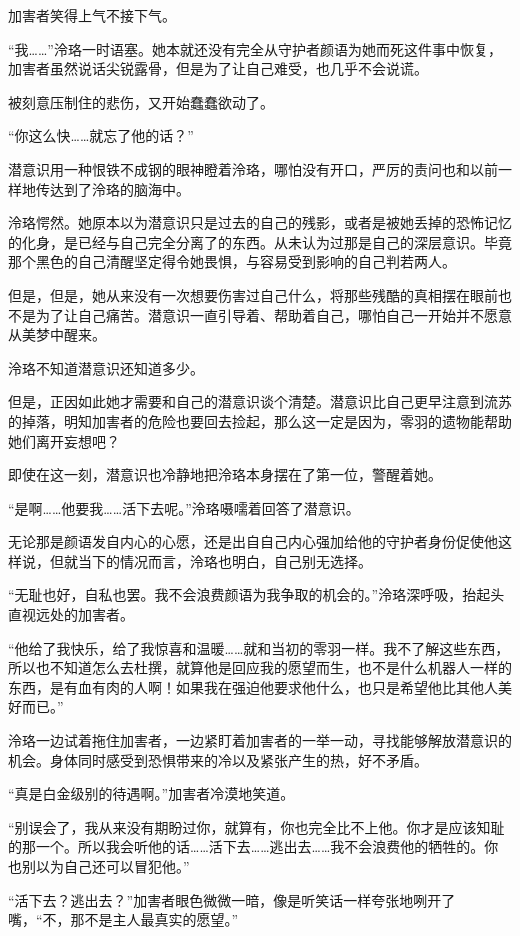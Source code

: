 \documentclass[UTF8, scheme = chinese, openany]{ctexbook}
\begin{document}
加害者笑得上气不接下气。

“我……”泠珞一时语塞。她本就还没有完全从守护者颜语为她而死这件事中恢复，加害者虽然说话尖锐露骨，但是为了让自己难受，也几乎不会说谎。

被刻意压制住的悲伤，又开始蠢蠢欲动了。

“你这么快……就忘了他的话？”

潜意识用一种恨铁不成钢的眼神瞪着泠珞，哪怕没有开口，严厉的责问也和以前一样地传达到了泠珞的脑海中。

泠珞愕然。她原本以为潜意识只是过去的自己的残影，或者是被她丢掉的恐怖记忆的化身，是已经与自己完全分离了的东西。从未认为过那是自己的深层意识。毕竟那个黑色的自己清醒坚定得令她畏惧，与容易受到影响的自己判若两人。

但是，但是，她从来没有一次想要伤害过自己什么，将那些残酷的真相摆在眼前也不是为了让自己痛苦。潜意识一直引导着、帮助着自己，哪怕自己一开始并不愿意从美梦中醒来。

泠珞不知道潜意识还知道多少。

但是，正因如此她才需要和自己的潜意识谈个清楚。潜意识比自己更早注意到流苏的掉落，明知加害者的危险也要回去捡起，那么这一定是因为，零羽的遗物能帮助她们离开妄想吧？

即使在这一刻，潜意识也冷静地把泠珞本身摆在了第一位，警醒着她。

“是啊……他要我……活下去呢。”泠珞嗫嚅着回答了潜意识。

无论那是颜语发自内心的心愿，还是出自自己内心强加给他的守护者身份促使他这样说，但就当下的情况而言，泠珞也明白，自己别无选择。

“无耻也好，自私也罢。我不会浪费颜语为我争取的机会的。”泠珞深呼吸，抬起头直视远处的加害者。

“他给了我快乐，给了我惊喜和温暖……就和当初的零羽一样。我不了解这些东西，所以也不知道怎么去杜撰，就算他是回应我的愿望而生，也不是什么机器人一样的东西，是有血有肉的人啊！如果我在强迫他要求他什么，也只是希望他比其他人美好而已。”

泠珞一边试着拖住加害者，一边紧盯着加害者的一举一动，寻找能够解放潜意识的机会。身体同时感受到恐惧带来的冷以及紧张产生的热，好不矛盾。

“真是白金级别的待遇啊。”加害者冷漠地笑道。

“别误会了，我从来没有期盼过你，就算有，你也完全比不上他。你才是应该知耻的那一个。所以我会听他的话……活下去……逃出去……我不会浪费他的牺牲的。你也别以为自己还可以冒犯他。”

“活下去？逃出去？”加害者眼色微微一暗，像是听笑话一样夸张地咧开了嘴，“不，那不是主人最真实的愿望。”
\end{document}
